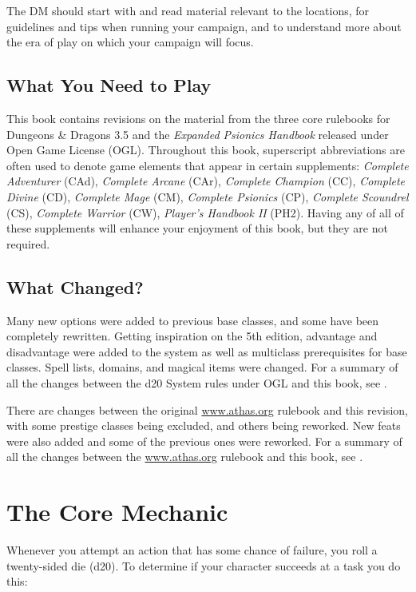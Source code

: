 The DM should start with  and read material relevant to the locations,  for guidelines and tips when running your campaign, and  to understand more about the era of play on which your campaign will focus.

\subsection{What You Need to Play}
This book contains revisions on the material from the three core rulebooks for {\tableheader Dungeons \& Dragons 3.5} and the \emph{Expanded Psionics Handbook} released under Open Game License (OGL). Throughout this book, superscript abbreviations are often used to denote game elements that appear in certain supplements: \emph{Complete Adventurer} (CAd), \emph{Complete Arcane} (CAr), \emph{Complete Champion} (CC), \emph{Complete Divine} (CD), \emph{Complete Mage} (CM), \emph{Complete Psionics} (CP), \emph{Complete Scoundrel} (CS), \emph{Complete Warrior} (CW), \emph{Player's Handbook II} (PH2). Having any of all of these supplements will enhance your enjoyment of this book, but they are not required.

\subsection{What Changed?}
Many new options were added to previous base classes, and some have been completely rewritten. Getting inspiration on the 5th edition, advantage and disadvantage were added to the system as well as multiclass prerequisites for base classes. Spell lists, domains, and magical items were changed. For a summary of all the changes between the d20 System rules under OGL and this book, see .

There are changes between the original \url{www.athas.org} rulebook and this revision, with some prestige classes being excluded, and others being reworked. New feats were also added and some of the previous ones were reworked. For a summary of all the changes between the \url{www.athas.org} rulebook and this book, see .


\clearpage
\section{The Core Mechanic}
Whenever you attempt an action that has some chance of failure, you roll a twenty-sided die (d20). To determine if your character succeeds at a task you do this:

